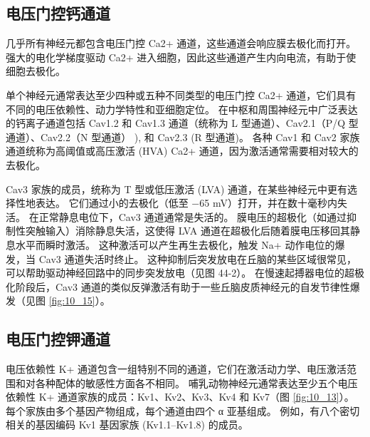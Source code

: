 \subsection{电压门控钙通道}
几乎所有神经元都包含电压门控 Ca2+ 通道，这些通道会响应膜去极化而打开。 
强大的电化学梯度驱动 Ca2+ 进入细胞，因此这些通道产生内向电流，有助于使细胞去极化。


单个神经元通常表达至少四种或五种不同类型的电压门控 Ca2+ 通道，它们具有不同的电压依赖性、动力学特性和亚细胞定位。 
在中枢和周围神经元中广泛表达的钙离子通道包括 Cav1.2 和 Cav1.3 通道（统称为 L 型通道）、Cav2.1（P/Q 型通道）、Cav2.2（N 型通道） ), 和 Cav2.3 (R 型通道)。 
各种 Cav1 和 Cav2 家族通道统称为高阈值或高压激活 (HVA) Ca2+ 通道，因为激活通常需要相对较大的去极化。


Cav3 家族的成员，统称为 T 型或低压激活 (LVA) 通道，在某些神经元中更有选择性地表达。 
它们通过小的去极化（低至 −65 mV）打开，并在数十毫秒内失活。 
在正常静息电位下，Cav3 通道通常是失活的。 膜电压的超极化（如通过抑制性突触输入）消除静息失活，这使得 LVA 通道在超极化后随着膜电压移回其静息水平而瞬时激活。 
这种激活可以产生再生去极化，触发 Na+ 动作电位的爆发，当 Cav3 通道失活时终止。 
这种抑制后突发放电在丘脑的某些区域很常见，可以帮助驱动神经回路中的同步突发放电（见图 44-2）。 
在慢速起搏器电位的超极化阶段后，Cav3 通道的类似反弹激活有助于一些丘脑皮质神经元的自发节律性爆发（见图 \ref{fig:10_15}）。


\subsection{电压门控钾通道}
电压依赖性 K+ 通道包含一组特别不同的通道，它们在激活动力学、电压激活范围和对各种配体的敏感性方面各不相同。 
哺乳动物神经元通常表达至少五个电压依赖性 K+ 通道家族的成员：Kv1、Kv2、Kv3、Kv4 和 Kv7（图 \ref{fig:10_13}）。 
每个家族由多个基因产物组成，每个通道由四个 α 亚基组成。 
例如，有八个密切相关的基因编码 Kv1 基因家族 (Kv1.1–Kv1.8) 的成员。

